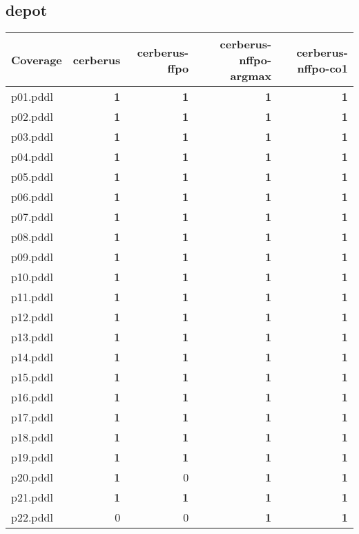 \documentclass{article}
\begin{document}
\subsection*{depot}

\begin{tabular}{@{}lrrrr@{}}
Coverage & cerberus & cerberus-ffpo & cerberus-nffpo-argmax & cerberus-nffpo-co1 \\
\midrule
p01.pddl & \textbf{1} & \textbf{1} & \textbf{1} & \textbf{1} \\
p02.pddl & \textbf{1} & \textbf{1} & \textbf{1} & \textbf{1} \\
p03.pddl & \textbf{1} & \textbf{1} & \textbf{1} & \textbf{1} \\
p04.pddl & \textbf{1} & \textbf{1} & \textbf{1} & \textbf{1} \\
p05.pddl & \textbf{1} & \textbf{1} & \textbf{1} & \textbf{1} \\
p06.pddl & \textbf{1} & \textbf{1} & \textbf{1} & \textbf{1} \\
p07.pddl & \textbf{1} & \textbf{1} & \textbf{1} & \textbf{1} \\
p08.pddl & \textbf{1} & \textbf{1} & \textbf{1} & \textbf{1} \\
p09.pddl & \textbf{1} & \textbf{1} & \textbf{1} & \textbf{1} \\
p10.pddl & \textbf{1} & \textbf{1} & \textbf{1} & \textbf{1} \\
p11.pddl & \textbf{1} & \textbf{1} & \textbf{1} & \textbf{1} \\
p12.pddl & \textbf{1} & \textbf{1} & \textbf{1} & \textbf{1} \\
p13.pddl & \textbf{1} & \textbf{1} & \textbf{1} & \textbf{1} \\
p14.pddl & \textbf{1} & \textbf{1} & \textbf{1} & \textbf{1} \\
p15.pddl & \textbf{1} & \textbf{1} & \textbf{1} & \textbf{1} \\
p16.pddl & \textbf{1} & \textbf{1} & \textbf{1} & \textbf{1} \\
p17.pddl & \textbf{1} & \textbf{1} & \textbf{1} & \textbf{1} \\
p18.pddl & \textbf{1} & \textbf{1} & \textbf{1} & \textbf{1} \\
p19.pddl & \textbf{1} & \textbf{1} & \textbf{1} & \textbf{1} \\
p20.pddl & \textbf{1} & 0 & \textbf{1} & \textbf{1} \\
p21.pddl & \textbf{1} & \textbf{1} & \textbf{1} & \textbf{1} \\
p22.pddl & 0 & 0 & \textbf{1} & \textbf{1} \\
\end{tabular}
\end{document}
